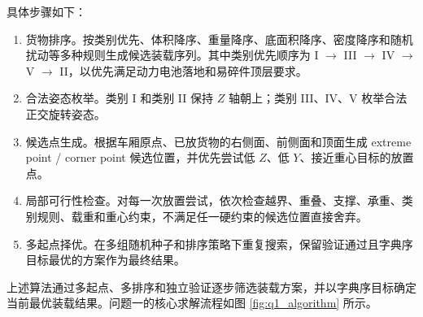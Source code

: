 ﻿\documentclass[UTF8,a4paper,12pt]{ctexart}
\begin{document}
	具体步骤如下：
	\begin{enumerate}
		\item 货物排序。按类别优先、体积降序、重量降序、底面积降序、密度降序和随机扰动等多种规则生成候选装载序列。其中类别优先顺序为 I $\rightarrow$ III $\rightarrow$ IV $\rightarrow$ V $\rightarrow$ II，以优先满足动力电池落地和易碎件顶层要求。
		\item 合法姿态枚举。类别 I 和类别 II 保持 $Z$ 轴朝上；类别 III、IV、V 枚举合法正交旋转姿态。
		\item 候选点生成。根据车厢原点、已放货物的右侧面、前侧面和顶面生成 extreme point / corner point 候选位置，并优先尝试低 $Z$、低 $Y$、接近重心目标的放置点。
		\item 局部可行性检查。对每一次放置尝试，依次检查越界、重叠、支撑、承重、类别规则、载重和重心约束，不满足任一硬约束的候选位置直接舍弃。
		\item 多起点择优。在多组随机种子和排序策略下重复搜索，保留验证通过且字典序目标最优的方案作为最终结果。
	\end{enumerate}
	
	上述算法通过多起点、多排序和独立验证逐步筛选装载方案，并以字典序目标确定当前最优装载结果。问题一的核心求解流程如图 \ref{fig:q1_algorithm} 所示。
	
\end{document}
